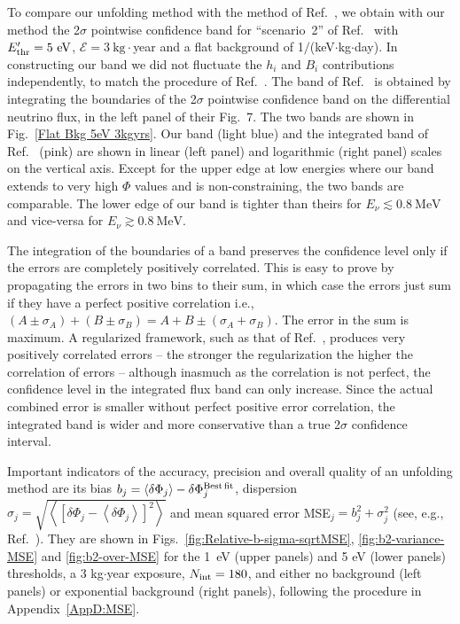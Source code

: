 \documentclass[a4paper,11pt]{article}
\renewcommand\({\left(}
\renewcommand\){\right)}
\renewcommand\[{\left[}
\renewcommand\]{\right]}
\theoremstyle{definition}
\newcommand{\mc}{\mathcal}
\newcommand{\pr}{\prime}
\newcommand{\eV}{\text{eV}}
\newcommand{\MeV}{\text{MeV}}
\newcommand{\kg}{\text{kg}}
\begin{document}
To compare our unfolding method with the method of Ref.~\cite{Liao:2023kyy}, we obtain with our method the 2$\sigma$ pointwise confidence band for ``scenario~2'' of Ref.~\cite{Liao:2023kyy} with $E^\pr_{\rm thr} = 5~\eV$,  $\mc E = 3~\kg\cdot$year and a flat background of 1$/$(keV$\cdot$kg$\cdot$day).
In constructing our band we did not fluctuate the $h_i$ and $B_i$ contributions independently, to match the procedure of Ref.~\cite{Liao:2023kyy}.
The band of Ref.~\cite{Liao:2023kyy} is obtained by integrating the boundaries of the 2$\sigma$ pointwise confidence band on the differential neutrino flux, in the left panel of their Fig.~7.
The two bands are shown in Fig.~\ref{Flat Bkg 5eV 3kgyrs}.
 Our band (light blue) and the integrated band of Ref.~\cite{Liao:2023kyy} (pink) are shown in linear (left panel) and logarithmic (right panel) scales on the vertical axis. Except for the upper edge at low energies where our band extends to very high $\Phi$ values and is non-constraining, the two bands are comparable. The  lower edge of our band is tighter than theirs for $E_\nu \lesssim 0.8~\MeV$ and vice-versa for $E_\nu \gtrsim 0.8~\MeV$. 
 

The integration of the boundaries of a band preserves the confidence level only if the errors are completely positively correlated. This is easy to prove by propagating the errors in two bins to their sum, in which case the errors just sum if they have a perfect positive correlation i.e., $(A \pm \sigma_A) + (B \pm \sigma_B)= A +B \pm (\sigma_A + \sigma_B)$. The error in the sum is maximum. A regularized framework, such as that of Ref.~\cite{Liao:2023kyy}, produces very positively correlated errors -- the stronger the regularization the higher the correlation of errors -- although inasmuch as the correlation is not perfect, the confidence level in the integrated flux band can only increase. Since the actual combined error is smaller without perfect positive error correlation, the integrated band is wider and more conservative than a true 2$\sigma$ confidence interval. 

Important indicators of the accuracy, precision and overall quality of an unfolding method are its bias  $b_j = \left<\delta\Phi_j\right>- \delta\Phi^{\rm Best\,fit}_j$, dispersion $\sigma_j= \sqrt{\left<[ \delta\Phi_j - \left<\delta\Phi_j\right>]^2\right>}$ and mean squared error MSE$_j= b_j^2 + \sigma_j^2$ (see, e.g., Ref.~\cite{Cowan:1998}).  They are shown in Figs.~\ref{fig:Relative-b-sigma-sqrtMSE}, \ref{fig:b2-variance-MSE} and \ref{fig:b2-over-MSE} for the 1~eV (upper panels) and 5 eV (lower panels) thresholds, a 3 kg$\cdot$year exposure, $N_{\rm int} = 180$, and  either no background (left panels) or exponential background (right panels), following the procedure in Appendix~\ref{AppD:MSE}.
\end{document}
